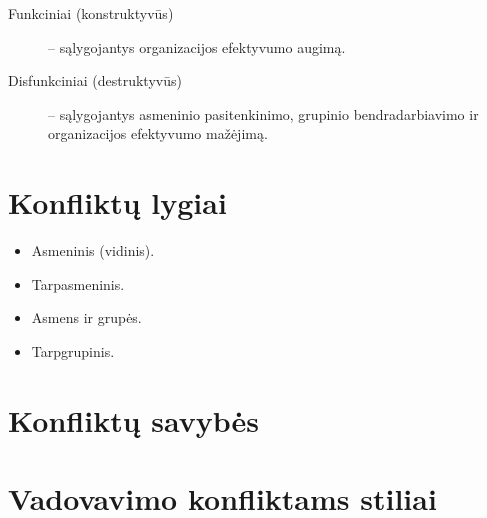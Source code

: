\begin{description}
  \item[Funkciniai (konstruktyvūs)] – sąlygojantys organizacijos efektyvumo
    augimą.
  \item[Disfunkciniai (destruktyvūs)] – sąlygojantys asmeninio
    pasitenkinimo, grupinio bendradarbiavimo ir organizacijos efektyvumo
    mažėjimą.
\end{description}

\section{Konfliktų lygiai}

\begin{itemize}
  \item Asmeninis (vidinis).
  \item Tarpasmeninis.
  \item Asmens ir grupės.
  \item Tarpgrupinis.
\end{itemize}

\section{Konfliktų savybės}


\section{Vadovavimo konfliktams stiliai}

